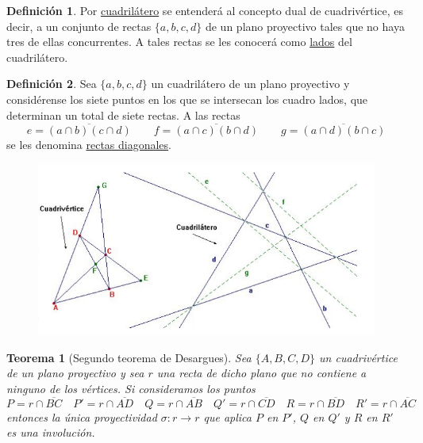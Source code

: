 \documentclass[12pt]{report}
\newtheorem{theorem}{Teorema}[chapter]
\theoremstyle{definition}
\newtheorem{definition}{Definición}[chapter]
\theoremstyle{definition}
\theoremstyle{remark}
\begin{document}
\begin{definition}
Por \ul{cuadrilátero} se entenderá al concepto dual de cuadrivértice, es decir, a un conjunto de rectas $\{a,b,c,d\}$ de un plano proyectivo tales que no haya tres de ellas concurrentes. A tales rectas se les conocerá como \ul{lados} del cuadrilátero.
\end{definition}

\begin{definition}
Sea $\{a,b,c,d\}$ un cuadrilátero de un plano proyectivo y considérense los siete puntos en los que se intersecan los cuadro lados, que determinan un total de siete rectas. A las rectas
\[e = \overline{(a \cap b) (c \cap d)} \qquad f = \overline{(a \cap c) (b \cap d)} \qquad g = \overline{(a \cap d) (b \cap c)}\]
se les denomina \ul{rectas diagonales}.
\end{definition}

\begin{figure}[h]
\includegraphics[scale = 0.7]{2.8_1}
\centering
\end{figure}

\begin{theorem}[Segundo teorema de Desargues]
Sea $\{A,B,C,D\}$ un cuadrivértice de un plano proyectivo y sea $r$ una recta de dicho plano que no contiene a ninguno de los vértices. Si consideramos los puntos
\[P = r \cap \overline{BC} \quad P' = r \cap \overline{AD} \quad Q = r \cap \overline{AB} \quad Q' = r \cap \overline{CD} \quad R = r \cap \overline{BD} \quad R' = r \cap \overline{AC}\]
entonces la única proyectividad $\sigma \colon r \to r$ que aplica $P$ en $P'$, $Q$ en $Q'$ y $R$ en $R'$ es una involución.
\end{theorem}
\end{document}
